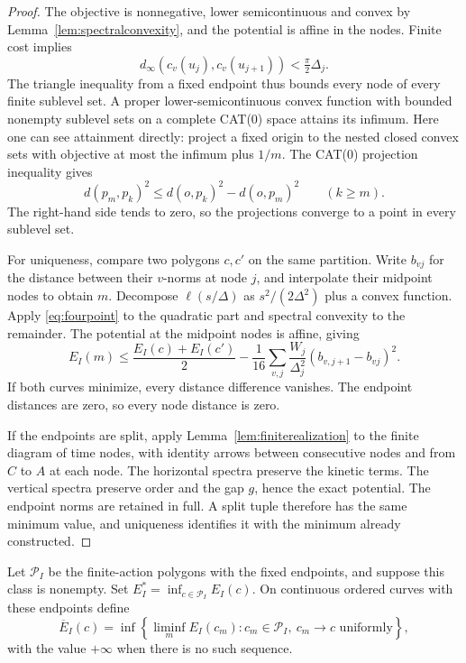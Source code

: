 \begin{proof}
The objective is nonnegative, lower semicontinuous and convex by
Lemma~\ref{lem:spectralconvexity}, and the potential is affine in
the nodes. Finite cost implies
\[
 d_\infty(c_v(u_j),c_v(u_{j+1}))<\tfrac\pi2\Delta_j.
\]
The triangle inequality from a fixed endpoint thus bounds every node
of every finite sublevel set. A proper lower-semicontinuous convex
function with bounded nonempty sublevel sets on a complete CAT(0)
space attains its infimum. Here one can see attainment directly:
project a fixed origin to the nested closed convex sets with objective
at most the infimum plus $1/m$. The CAT(0) projection inequality gives
\[
 d(p_m,p_k)^2\le d(o,p_k)^2-d(o,p_m)^2\qquad(k\ge m).
\]
The right-hand side tends to zero, so the projections converge to a
point in every sublevel set.

For uniqueness, compare two polygons $c,c'$ on the same partition.
Write $b_{vj}$ for the distance between their $v$-norms at node $j$,
and interpolate their midpoint nodes to obtain $m$.
Decompose $\ell(s/\Delta)$ as
$s^2/(2\Delta^2)$ plus a convex function. Apply
\eqref{eq:fourpoint} to the quadratic part and spectral convexity to
the remainder. The potential at the midpoint nodes is affine, giving
\begin{equation}\label{eq:polygonmidpoint}
 E_I(m)\le\frac{E_I(c)+E_I(c')}{2}
   -\frac1{16}\sum_{v,j}\frac{W_j}{\Delta_j^2}
                         (b_{v,j+1}-b_{vj})^2.
\end{equation}
If both curves minimize, every distance difference vanishes. The
endpoint distances are zero, so every node distance is zero.

If the endpoints are split, apply
Lemma~\ref{lem:finiterealization} to the finite diagram of time nodes,
with identity arrows between consecutive nodes and from $C$ to $A$
at each node. The horizontal spectra preserve the kinetic terms.
The vertical spectra preserve order and the gap $g$, hence the exact
potential. The endpoint norms are retained in full. A split tuple
therefore has the same minimum value, and uniqueness identifies it
with the minimum already constructed.
\end{proof}

Let $\mathcal P_I$ be the finite-action polygons with the fixed endpoints,
and suppose this class is nonempty. Set
$E_I^*=\inf_{c\in\mathcal P_I}E_I(c)$. On continuous ordered curves
with these endpoints define
\begin{equation}\label{eq:localrelaxation}
 \overline E_I(c)=\inf\left\{\liminf_m E_I(c_m):
      c_m\in\mathcal P_I,\ c_m\longrightarrow c\text{ uniformly}\right\},
\end{equation}
with the value $+\infty$ when there is no such sequence.

